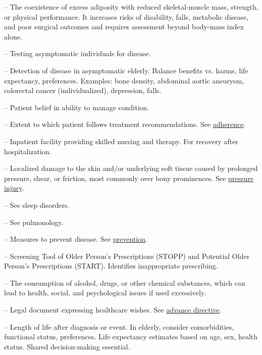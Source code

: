 -- The coexistence of excess adiposity with reduced skeletal-muscle mass, strength, or physical performance. It increases risks of disability, falls, metabolic disease, and poor surgical outcomes and requires assessment beyond body-mass index alone.

-- Testing asymptomatic individuals for disease.





-- Detection of disease in asymptomatic elderly. Balance benefits vs. harms, life expectancy, preferences. Examples: bone density, abdominal aortic aneurysm, colorectal cancer (individualized), depression, falls.

-- Patient belief in ability to manage condition.


-- Extent to which patient follows treatment recommendations. See \hyperlink{Adherence}{adherence}.

-- Inpatient facility providing skilled nursing and therapy. For recovery after hospitalization.

-- Localized damage to the skin and/or underlying soft tissue caused by prolonged pressure, shear, or friction, most commonly over bony prominences. See \hyperlink{Pressure Injury}{pressure injury}.

-- See sleep disorders.

-- See pulmonology.

-- Measures to prevent disease. See \hyperlink{Prevention}{prevention}.

-- Screening Tool of Older Person's Prescriptions (STOPP) and Potential Older Person's Prescriptions (START). Identifies inappropriate prescribing.

-- The consumption of alcohol, drugs, or other chemical substances, which can lead to health, social, and psychological issues if used excessively.

-- Legal document expressing healthcare wishes. See \hyperlink{Advance Directive}{advance directive}.

-- Length of life after diagnosis or event. In elderly, consider comorbidities, functional status, preferences. Life expectancy estimates based on age, sex, health status. Shared decision-making essential.

